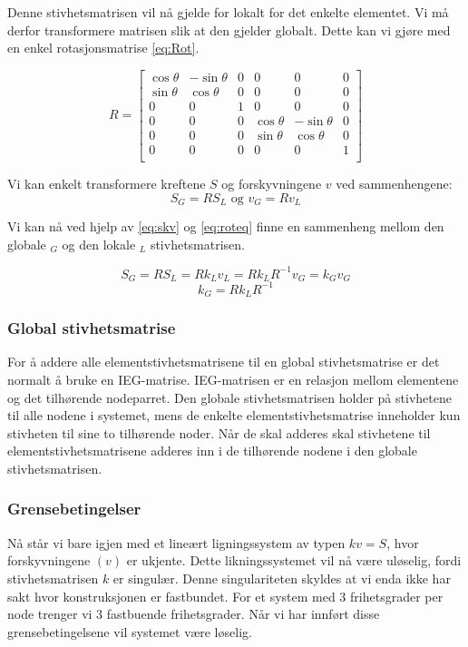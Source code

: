 \documentclass[10pt,a4paper, norsk]{article}
\begin{document}
Denne stivhetsmatrisen vil nå gjelde for lokalt for det enkelte elementet. Vi må derfor transformere matrisen slik at den gjelder globalt. Dette kan vi gjøre med en enkel rotasjonsmatrise \eqref{eq:Rot}. 

\begin{equation} \label{eq:Rot}
R  = \begin{bmatrix}
\cos \theta & -\sin \theta &   0&0&0&0\\[3pt]
\sin \theta & \cos \theta  & 0&0&0&0\\[3pt]
0 &0 & 1&0&0&0\\
0&0&0&\cos \theta & -\sin \theta&   0 \\[3pt]
0&0&0&\sin \theta & \cos \theta  & 0\\[3pt]
0&0&0&0 &0 & 1\\
\end{bmatrix} 
\end{equation}

Vi kan enkelt transformere kreftene $S$ og forskyvningene $v$ ved sammenhengene:
\begin{equation} \label{eq:roteq}
S_G=RS_L  \text{ og } v_G=Rv_L 
\end{equation}

Vi kan nå ved hjelp av \ref{eq:skv} og \ref{eq:roteq} finne en sammenheng mellom den globale $_G$ og den lokale $_L$ stivhetsmatrisen.

\begin{equation}
S_G=RS_L=Rk_Lv_L=Rk_LR^{-1}v_G=k_Gv_G 
\end{equation}
\begin{equation} \label{eq:klkg}
k_G=Rk_LR^{-1}
\end{equation}

\subsubsection*{Global stivhetsmatrise}
For å addere alle elementstivhetsmatrisene til en global stivhetsmatrise er det normalt å bruke en IEG-matrise. IEG-matrisen er en relasjon mellom elementene og det tilhørende nodeparret. Den globale stivhetsmatrisen holder på stivhetene til alle nodene i systemet, mens de enkelte elementstivhetsmatrise inneholder kun stivheten til sine to tilhørende noder. Når de skal adderes skal stivhetene til elementstivhetsmatrisene adderes inn i de tilhørende nodene i den globale stivhetsmatrisen. 

\subsubsection*{Grensebetingelser}
Nå står vi bare igjen med et lineært ligningssystem av typen $kv=S$, hvor forskyvningene $(v)$ er ukjente. Dette likningssystemet vil nå være uløselig, fordi stivhetsmatrisen $k$ er singulær. Denne singulariteten skyldes at vi enda ikke har sakt hvor konstruksjonen er fastbundet. For et system med 3 frihetsgrader per node trenger vi 3 fastbuende frihetsgrader. Når vi har innført disse grensebetingelsene vil systemet være løselig.
\end{document}
